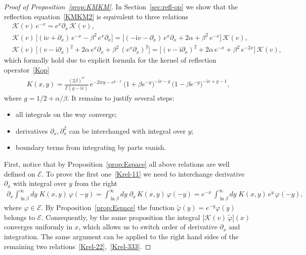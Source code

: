 \documentclass[11pt]{article}
\numberwithin{equation}{section}
\theoremstyle{plain}
\theoremstyle{definition}
\renewcommand{\phi}{\varphi}
\renewcommand{\imath}{\mathrm{i}}
\begin{document}
\begin{proof}[Proof of Proposition~\ref{prop:KMKM}]
	In Section~\ref{sec:refl-op} we show that the reflection equation~\eqref{KMKM2} is equivalent to three relations
	\begin{align} \label{Krel-11}
		&\mathcal{K}(v)\,e^{-x} = e^{x}\partial_x\,\mathcal{K}(v), \\[6pt]  \label{Krel-22}
		&\mathcal{K}(v) \, \bigl[ (\imath v + \partial_x)\,e^{-x} - \beta^2\,e^{x}\partial_x \bigr] =
		\bigl[ (-\imath v - \partial_x)\,e^{x}\partial_x + 2\alpha + \beta^2\,e^{-x} \bigr] \, \mathcal{K}(v), \\[6pt] \label{Krel-333}
		& \mathcal{K}(v)\,\bigl[(v-\imath\partial_x)^2+2\alpha\,e^{x}\partial_x+
		\beta^2\,(e^{x}\partial_x)^2\bigr] =
		\bigl[(v-\imath\partial_x)^2+2\alpha\,e^{-x}+\beta^2\,e^{-2x}\bigr]\,\mathcal{K}(v),
	\end{align}
	which formally hold due to explicit formula for the kernel of reflection operator~\eqref{Kop}
	\begin{align} \label{Kker2}
		K(x,y) = \frac{(2\beta)^{\imath v}}{\Gamma ( g- \imath v )} \,  e^{-2 \imath v y - e^{y -x} }  \, \bigl(1 + \beta e^{-y}\bigr)^{- \imath v - g } \, \bigl(1 - \beta e^{-y}\bigr)^{- \imath v + g - 1},
	\end{align}
	where $g = 1/2 + \alpha/\beta$.
	It remains to justify several steps:
	\begin{itemize}
		\item[(1)] all integrals on the way converge;
		\item[(2)] derivatives $\partial_{x}, \partial_x^2$ can be interchanged with integral over $y$;
		\item[(3)] boundary terms from integrating by parts vanish.
	\end{itemize}
	First, notice that by Proposition~\ref{prop:Espace} all above relations are well defined on $\mathcal{E}$. To prove the first one~\eqref{Krel-11} we need to interchange derivative $\partial_x$ with integral over $y$ from the right 
	\begin{align}
		\partial_x \int_{\ln \beta}^\infty dy \; K(x,y) \, \phi(-y) = \int_{\ln \beta}^\infty dy \; \partial_x  \, K(x,y) \, \phi(-y) = e^{-x} \, \int_{\ln \beta}^\infty dy \; K(x,y) \, e^{y} \, \phi(-y),
	\end{align}
	where $\phi \in \mathcal{E}$. By Proposition~\ref{prop:Espace} the function $\tilde{\phi}(y) = e^{-y} \phi(y)$ belongs to $\mathcal{E}$. Consequently, by the same proposition the integral $\bigl[ \mathcal{K}(v) \, \tilde{\phi} \bigr](x)$ converges uniformly in $x$, which allows us to switch order of derivative $\partial_x$ and integration. The same argument can be applied to the right hand sides of the remaining two relations~\eqref{Krel-22},~\eqref{Krel-333}.
	

\end{proof}
\end{document}
